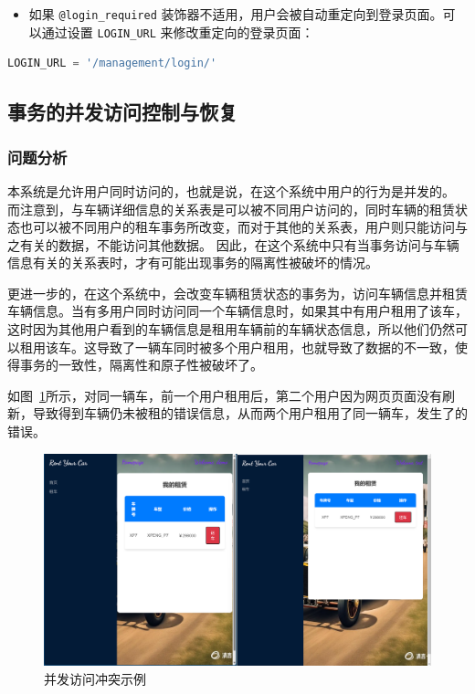 \documentclass[UTF8,a4paper,12pt]{ctexart}
\begin{document}
\begin{itemize}
    \item 如果 \texttt{@login\_required} 装饰器不适用，用户会被自动重定向到登录页面。可以通过设置 \texttt{LOGIN\_URL} 来修改重定向的登录页面：
\end{itemize}

\begin{lstlisting}[language=Python]
LOGIN_URL = '/management/login/' 
\end{lstlisting}

\subsection{事务的并发访问控制与恢复}
\label{sec:recur}
\subsubsection{问题分析}
本系统是允许用户同时访问的，也就是说，在这个系统中用户的行为是并发的。
而注意到，与车辆详细信息的关系表是可以被不同用户访问的，同时车辆的租赁状态也可以被不同用户的租车事务所改变，而对于其他的关系表，用户则只能访问与之有关的数据，不能访问其他数据。
因此，在这个系统中只有当事务访问与车辆信息有关的关系表时，才有可能出现事务的隔离性被破坏的情况。

更进一步的，在这个系统中，会改变车辆租赁状态的事务为，访问车辆信息并租赁车辆信息。当有多用户同时访问同一个车辆信息时，如果其中有用户租用了该车，这时因为其他用户看到的车辆信息是租用车辆前的车辆状态信息，所以他们仍然可以租用该车。这导致了一辆车同时被多个用户租用，也就导致了数据的不一致，使得事务的一致性，隔离性和原子性被破坏了。

如图~\ref{fig:exam}所示，对同一辆车，前一个用户租用后，第二个用户因为网页页面没有刷新，导致得到车辆仍未被租的错误信息，从而两个用户租用了同一辆车，发生了的错误。
\begin{figure}[htbp]  %
    \centering  %
    \includegraphics[width=1\textwidth]{pic/exam.png}
    \caption{并发访问冲突示例}  %
    \label{fig:exam}  %
\end{figure}
\end{document}

